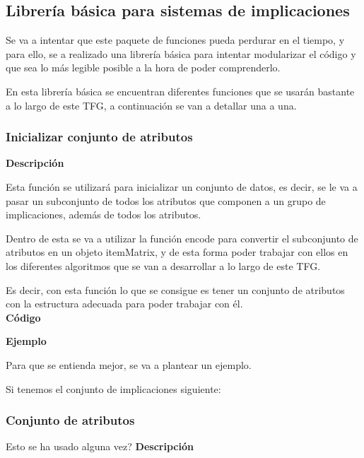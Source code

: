 \subsection{Librer\'ia b\'asica para sistemas de implicaciones}
Se va a intentar que este paquete de funciones pueda perdurar en el tiempo, y para ello, 
se a realizado una librer\'ia b\'asica para intentar modularizar el c\'odigo y que sea lo 
m\'as legible posible a la hora de poder comprenderlo.

En esta librer\'ia b\'asica se encuentran diferentes funciones que se usar\'an bastante a lo largo de este TFG, a continuaci\'on 
se van a detallar una a una.




\subsubsection{Inicializar conjunto de atributos}

    \textbf{Descripci\'on}

    Esta funci\'on se utilizar\'a para inicializar un conjunto de datos, es decir, se le va a pasar un subconjunto 
    de todos los atributos que componen a un grupo de implicaciones, adem\'as de todos los atributos. 
    
    Dentro de esta se va a utilizar la funci\'on encode para convertir el subconjunto de atributos en un objeto itemMatrix, y de esta 
    forma poder trabajar con ellos en los diferentes algoritmos que se van a desarrollar a lo largo de este TFG.

    Es decir, con esta funci\'on lo que se consigue es tener un conjunto de atributos con la estructura adecuada para poder trabajar con \'el.
    \\

    
    \textbf{C\'odigo}
    
    
    
    
    \textbf{Ejemplo}

    Para que se entienda mejor, se va a plantear un ejemplo. 

    Si tenemos el conjunto de implicaciones siguiente: 





\subsubsection{Conjunto de atributos}
    Esto se ha usado alguna vez?
    \textbf{Descripci\'on}
    

